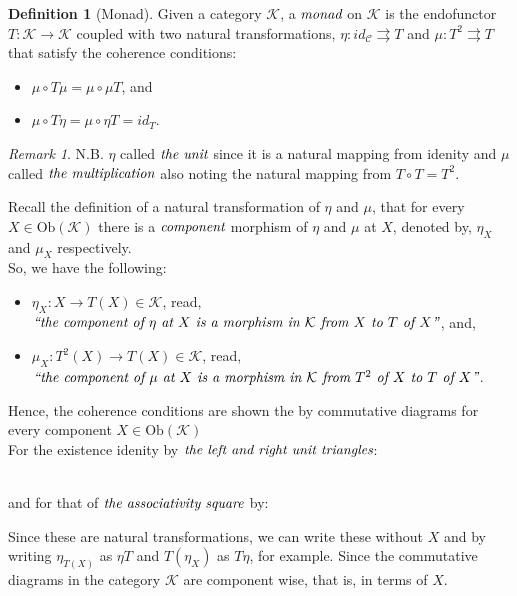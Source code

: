 \documentclass[10pt, oneside, reqno]{amsart}
\theoremstyle{plain}%
\theoremstyle{definition}
\newtheorem{defn}[thm]{Definition}
\theoremstyle{remark}
\newtheorem*{rem}{Remark}
\newcommand{\Id}{\mathit{id}_}
\begin{document}
\begin{defn}[Monad]
 Given a category $\mathcal{K}$, a $\emph{monad}$ on $\mathcal{K}$ is the endofunctor $T: \mathcal{K} \to \mathcal{K}$
 coupled with two natural transformations, $\eta: \Id{\mathcal{C}} \rightrightarrows T$ and $\mu: T^2 \rightrightarrows T$
 that satisfy the coherence conditions:
 \begin{itemize}
  \item $\mu \circ T \mu = \mu \circ \mu T$, and
  \item $\mu \circ T \eta = \mu \circ \eta T = \Id{T}$.
 \end{itemize}
\end{defn}
\begin{rem}
 N.B. $\eta$ called $\emph{the unit}$ since it is a natural mapping from idenity and
 $\mu$ called $\emph{the multiplication}$ also noting the natural mapping from $T \circ T = T^2$.
\end{rem}

Recall the definition of a natural transformation of $\eta$ and $\mu$, that for every $X \in \text{Ob}(\mathcal{K})$
there is a $\emph{component}$ morphism of $\eta$ and $\mu$ at $X$, denoted by, $\eta_{X}$ and $\mu_{X}$ respectively.
\\
So, we have the following:
\begin{itemize}
 \item $\eta_{X}: X \to T(X) \in \mathcal{K}$,
 read, $\emph{``the component of $\eta$ at $X$ is a morphism in $\mathcal{K}$ from $X$ to $T$ of $X$''}$, and,
 \item $\mu_{X}: T^2(X) \to T(X) \in \mathcal{K}$,
 read, $\emph{``the component of $\mu$ at $X$ is a morphism in $\mathcal{K}$ from $T^2$ of $X$ to $T$ of $X$''}$.
\end{itemize}

Hence, the coherence conditions are shown the by commutative diagrams for every component $X \in \text{Ob}(\mathcal{K})$
\\
For the existence idenity by $\emph{the left and right unit triangles}$:
\\
and for that of $\emph{the associativity square}$ by:
Since these are natural transformations,
we can write these without $X$ and by writing $\eta_{T(X)}$ as $\eta T$ and $T(\eta_{X})$ as $T \eta$, for example.
Since the commutative diagrams in the category $\mathcal{K}$ are component wise, that is, in terms of $X$.
\end{document}
